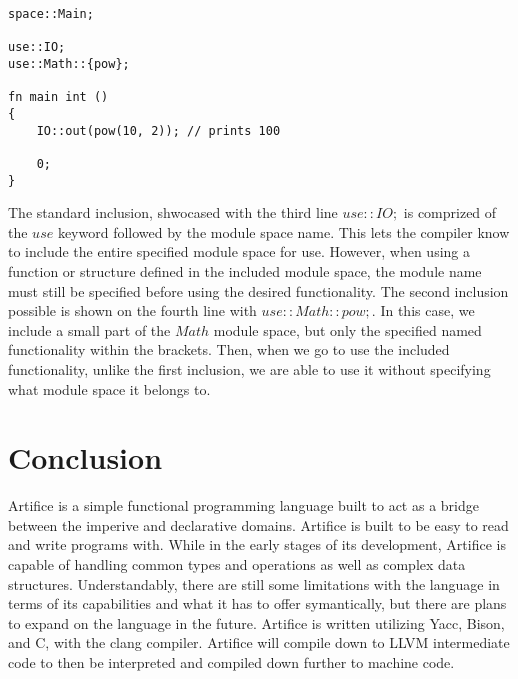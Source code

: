 \documentclass{article}
\begin{document}
\begin{lstlisting}
space::Main;

use::IO;
use::Math::{pow};

fn main int ()
{
	IO::out(pow(10, 2)); // prints 100

 	0;
}
\end{lstlisting}

The standard inclusion, shwocased with the third line $use::IO;$ is comprized of the $use$ keyword followed by the module space name. This lets the compiler know to include the
entire specified module space for use. However, when using a function or structure defined in the included module space, the module name must still be specified before using the desired
functionality. The second inclusion possible is shown on the fourth line with $use::Math::{pow};$. In this case, we include a small part of the $Math$ module space, but only the specified
named functionality within the brackets. Then, when we go to use the included functionality, unlike the first inclusion, we are able to use it without specifying what module space it belongs
to.


\section{Conclusion}

Artifice is a simple functional programming language built to act as a bridge between the imperive and declarative domains. Artifice is built to be easy to read and write programs with. While
in the early stages of its development, Artifice is capable of handling common types and operations as well as complex data structures. Understandably, there are still some limitations
with the language in terms of its capabilities and what it has to offer symantically, but there are plans to expand on the language in the future.
Artifice is written utilizing Yacc, Bison, and C, with the clang compiler. Artifice will compile down to LLVM intermediate code to then be interpreted and compiled down further
to machine code.
\end{document}
